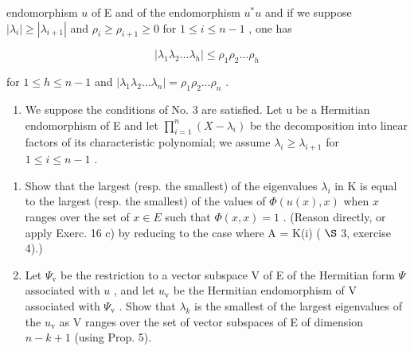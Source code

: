 endomorphism \(u\) of E and of the endomorphism \(u^*u\) and if we suppose \(|\lambda_i| \geqslant |\lambda_{i+1}|\) and \(\rho_i \geqslant \rho_{i+1} \geqslant 0\) for \(1 \leqslant i \leqslant n-1\) , one has

\[
\mid \lambda_ {1} \lambda_ {2} \dots \lambda_ {h} \mid \leqslant \rho_ {1} \rho_ {2} \dots \rho_ {h}
\]

for \(1 \leqslant h \leqslant n - 1\) and \(|\lambda_1\lambda_2 \ldots \lambda_n| = \rho_1\rho_2 \ldots \rho_n\) .

\begin{enumerate}
\def\labelenumi{\arabic{enumi})}
\setcounter{enumi}{20}
\tightlist
\item
  We suppose the conditions of No. 3 are satisfied. Let u be a Hermitian endomorphism of E and let \(\prod_{i=1}^{n}(X-\lambda_{i})\) be the decomposition into linear factors of its characteristic polynomial; we assume \(\lambda_{i}\geqslant\lambda_{i+1}\) for \(1\leqslant i\leqslant n-1\) .
\end{enumerate}

\begin{enumerate}
\def\labelenumi{\alph{enumi})}
\item
  Show that the largest (resp. the smallest) of the eigenvalues \(\lambda_{i}\) in K is equal to the largest (resp. the smallest) of the values of \(\Phi(u(x), x)\) when \(x\) ranges over the set of \(x \in E\) such that \(\Phi(x, x) = 1\) . (Reason directly, or apply Exerc. 16 c) by reducing to the case where A = K(i) ( \(\S\) 3, exercise 4).)
\item
  Let \(\Psi_{\mathrm{v}}\) be the restriction to a vector subspace V of E of the Hermitian form \(\Psi\) associated with \(u\) , and let \(u_{\mathrm{v}}\) be the Hermitian endomorphism of V associated with \(\Psi_{\mathrm{v}}\) . Show that \(\lambda_{k}\) is the smallest of the largest eigenvalues of the \(u_{\mathrm{v}}\) as V ranges over the set of vector subspaces of E of dimension \(n - k + 1\) (using Prop. 5).
\end{enumerate}

